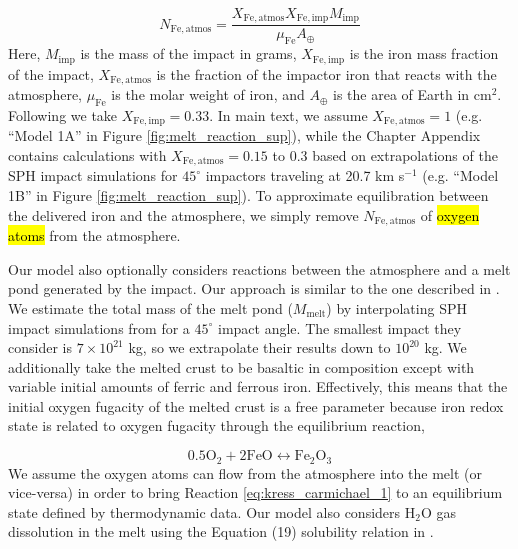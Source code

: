 \begin{equation}
  N_\mathrm{Fe,atmos} = \frac{X_\mathrm{Fe,atmos} X_\mathrm{Fe,imp} M_\mathrm{imp}}{\mu_\mathrm{Fe} A_\oplus}
\end{equation}
Here, $M_\mathrm{imp}$ is the mass of the impact in grams, $X_\mathrm{Fe,imp}$ is the iron mass fraction of the impact, $X_\mathrm{Fe,atmos}$ is the fraction of the impactor iron that reacts with the atmosphere, $\mu_\mathrm{Fe}$ is the molar weight of iron, and $A_\oplus$ is the area of Earth in cm$^2$. Following \citet{Zahnle_2020} we take $X_\mathrm{Fe,imp} = 0.33$. In main text, we assume $X_\mathrm{Fe,atmos} = 1$ (e.g. ``Model 1A'' in Figure \ref{fig:melt_reaction_sup}), while the Chapter Appendix contains calculations with $X_\mathrm{Fe,atmos} = 0.15$ to $0.3$ based on extrapolations of the \citet{Citron_2022} SPH impact simulations for $45^{\circ}$ impactors traveling at 20.7 km s$^{-1}$ (e.g. ``Model 1B'' in Figure \ref{fig:melt_reaction_sup}). To approximate equilibration between the delivered iron and the atmosphere, we simply remove $N_\mathrm{Fe,atmos}$ of \hl{oxygen atoms} from the atmosphere.

Our model also optionally considers reactions between the atmosphere and a melt pond generated by the impact. Our approach is similar to the one described in \citet{Itcovitz_2022}. We estimate the total mass of the melt pond ($M_\mathrm{melt}$) by interpolating SPH impact simulations from \citet{Citron_2022} for a $45^{\circ}$ impact angle. The smallest impact they consider is $7 \times 10^{21}$ kg, so we extrapolate their results down to $10^{20}$ kg. We additionally take the melted crust to be basaltic in composition except with variable initial amounts of ferric and ferrous iron. Effectively, this means that the initial oxygen fugacity of the melted crust is a free parameter because iron redox state is related to oxygen fugacity through the equilibrium reaction,

\begin{equation} 
  \label{eq:kress_carmichael_1}
  0.5 \mathrm{O_2} + 2 \mathrm{FeO} \leftrightarrow \mathrm{Fe_2O_3}
\end{equation}
We assume the oxygen atoms can flow from the atmosphere into the melt (or vice-versa) in order to bring Reaction \ref{eq:kress_carmichael_1} to an equilibrium state defined by \citet{Kress_1991} thermodynamic data. Our model also considers H$_2$O gas dissolution in the melt using the Equation (19) solubility relation in \citet{Itcovitz_2022}.


